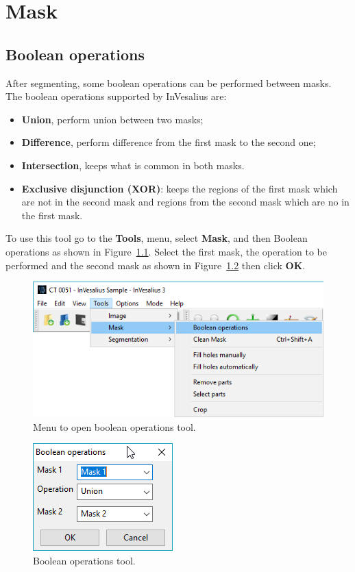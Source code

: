 \chapter{Mask}


\section{Boolean operations}

After segmenting, some boolean operations can be performed between masks. The boolean operations supported by InVesalius are:

\begin{itemize}
	\item \textbf{Union}, perform union between two masks;
	\item \textbf{Difference}, perform difference from the first mask to the second one;
	\item \textbf{Intersection}, keeps what is common in both masks.
	\item \textbf{Exclusive disjunction (XOR)}: keeps the regions of the first mask which are not in the second mask and regions from the second mask which are no in the first mask.
\end{itemize}

To use this tool go to the \textbf{Tools}, menu, select \textbf{Mask}, and then Boolean operations as shown in Figure~\ref{fig:booleano_menu}. Select the first mask, the operation to be performed and the second mask as shown in Figure~\ref{fig:booleano_janela} then click \textbf{OK}.


\begin{figure}[!htb]
\centering
\includegraphics[scale=0.5]{../user_guide_figures/invesalius_screen/mask_operation_boolean_menu_en.png}
\caption{Menu to open boolean operations tool.}
\label{fig:booleano_menu}
\end{figure}


\begin{figure}[!htb]
\centering
\includegraphics[scale=0.5]{../user_guide_figures/invesalius_screen/mask_boolean_dialog_en.png}
\caption{Boolean operations tool.}
\label{fig:booleano_janela}
\end{figure}

